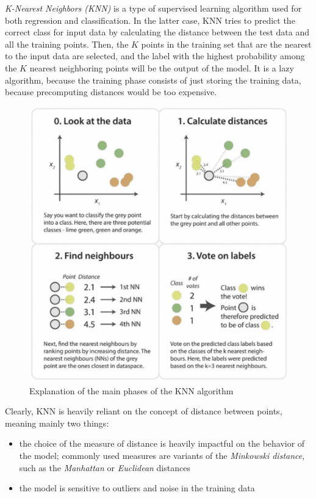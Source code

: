 \textit{K-Nearest Neighbors (KNN)} is a type of supervised learning algorithm used for both regression and classification. In the latter case, KNN tries to predict the correct class for input data by calculating the distance between the test data and all the training points. Then, the $K$ points in the training set that are the nearest to the input data are selected, and the label with the highest probability among the $K$ nearest neighboring points will be the output of the model.
It is a lazy algorithm, because the training phase consists of just storing the training data, because precomputing distances would be too expensive.

\begin{figure}[h]
    \centering
    \includegraphics[scale=0.5]{images/knn/algo-main-phases.png}
    \caption{Explanation of the main phases of the KNN algorithm}
    \label{fig:knn_algorithm_main}
\end{figure}

Clearly, KNN is heavily reliant on the concept of distance between points, meaning mainly two things:

\begin{itemize}
    \item the choice of the measure of distance is heavily impactful on the behavior of the model; commonly used measures are variants of the \textit{Minkowski distance}, such as the \textit{Manhattan} or \textit{Euclidean} distances
    
    \item the model is sensitive to outliers and noise in the training data
\end{itemize}

